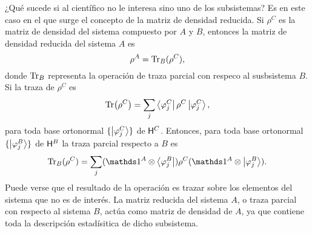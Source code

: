 ¿Qué sucede si al científico no le interesa sino uno de los subsistemas? Es en este caso en el que surge el concepto de la matriz de densidad reducida. Si $\rho^{C}$ es la matriz de densidad del sistema compuesto por $A$ y $B$, entonces la matriz de densidad reducida del sistema $A$ es
\begin{equation*}
    \rho^{A}=\Tr_{B}(\rho^{C}),
\end{equation*}
donde $\Tr_{B}$ representa la operación de traza parcial con respeco al susbsistema $B$. Si la traza de $\rho^{C}$ es 
\begin{equation*}
    \Tr(\rho^{C})=\sum_{j}\bra{\varphi^{C}_{j}}\rho^{C}\ket{\varphi^{C}_{j}},
\end{equation*}
para toda base ortonormal $\{\ket{\varphi^{C}_{j}}\}$ de ${\sf H}^{C}$. Entonces, para toda base ortonormal $\{\ket{\varphi^{B}_{j}}\}$ de ${\sf H}^{B}$  la traza parcial respecto a $B$ es \cite{Hardy}
\begin{equation*}
    \Tr_{B}(\rho^{C})=\sum_{j}(\Id^{A}\otimes \bra{\varphi^{B}_{j}})\rho^{C}(\Id^{A}\otimes \ket{\varphi^{B}_{j}}).
\end{equation*}
Puede verse que el resultado de la operación es trazar sobre los elementos del sistema que no es de interés. La matriz reducida del sistema $A$, o traza parcial con respecto al sistema $B$, actúa como matriz de densidad de $A$, ya que contiene toda la descripción estadísitica de dicho subsistema.